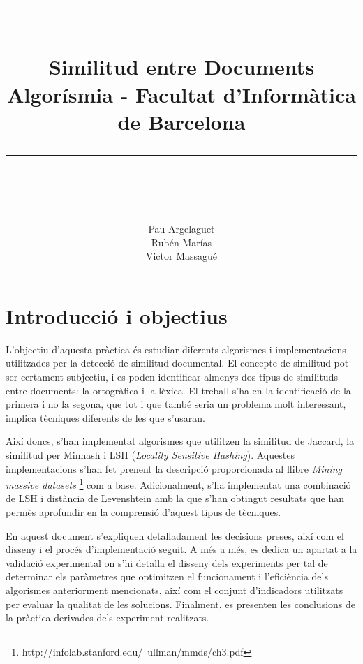 \documentclass[catalan, 12pt]{report}
\newcommand{\HRule}[1]{\rule{\linewidth}{#1}}
\begin{document}
\date{}
\title{ 
		\HRule{2pt} \\ [0.5cm]
		\textbf{Similitud entre Documents \\ }  
        {Algorísmia - Facultat d'Informàtica de Barcelona}
		\HRule{2pt} \\ [0.5cm]
        \vspace{100px}
		}
\date{}
\author{
		Pau Argelaguet \\ Rubén Marías \\ Victor Massagué  \\ 
	    }
\date{}
\maketitle
\tableofcontents
\thispagestyle{empty}

\chapter{Introducció  i objectius}

L'objectiu d'aquesta pràctica és estudiar diferents algorismes i implementacions utilitzades per la detecció de similitud documental. El concepte de similitud pot ser certament subjectiu, i es poden identificar almenys dos tipus de similituds entre documents: la ortogràfica i la lèxica. El treball s'ha en la identificació de la primera i no la segona, que tot i que també seria un problema molt interessant, implica tècniques diferents de les que s'usaran. \newline

Així doncs, s'han implementat algorismes que utilitzen la similitud de Jaccard, la similitud per Minhash i LSH (\textit{Locality Sensitive Hashing}).  Aquestes implementacions s'han fet prenent la descripció proporcionada al llibre \textit{Mining massive datasets} \footnote{http://infolab.stanford.edu/~ullman/mmds/ch3.pdf} com a base. Adicionalment, s'ha implementat una combinació de LSH i distància de Levenshtein amb la que s'han obtingut resultats que han permès aprofundir en la comprensió d'aquest tipus de tècniques. \newline

En aquest document s'expliquen detalladament les decisions preses, així com el disseny i el procés d'implementació seguit. A més a més, es dedica un apartat a la validació experimental on s'hi detalla el disseny dels experiments per tal de determinar els paràmetres que optimitzen el funcionament i l'eficiència dels algorismes anteriorment mencionats, així com el conjunt d'indicadors utilitzats per evaluar la qualitat de les solucions. Finalment, es presenten les conclusions de la pràctica derivades dels experiment realitzats.
\end{document}
